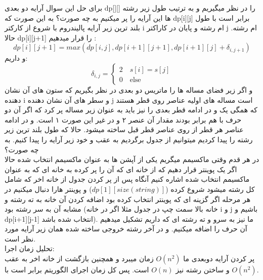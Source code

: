 \problem{}
برای حل این سوال آرایه دو بعدی dp[][] را در نظر میگیریم
و به ترتیب طول زیر رشته ها این آرایه را پر میکنیم به چه صورت؟
به این صورت که dp[i][j]
 برابر است با طول بلند ترین زیر آرایه پالیندروم 
 با شروع از کارکتر i ام رشته و پایان در کاراکتر j ام رشته.
حالا dp[i][j+1] را قرار میدهیم :\\
\[
    dp[i][j+1] = max(dp[i,j],dp[i+1][j+1],dp[i+1][j]+\delta_{i,j+1})    
\]
و داریم:\\
\[
    \delta_{i,j}=
    \begin{cases}
        2 \quad  s[i]=s[j]\\
        0 \quad  \text{else}
    \end{cases}
\]
و اگر زیر فضای مساله ها را ماتریس دو بعدی در نظر بگیریم که ستون های آن نشان دهنده i و
سطر های آن نشان دهنده j است
مساله های اولیه عناصر روی قطر هستند
که همگی یک و در ادامه قطر بعدی را نیز باید به عنوان زیر مساله پر کرد که اگر آن دو حرف با هم برابر بودند
مقدار آن عنصر ۲ و در غیر این صورت ۱ است.
و در ادامه عناصر هر قطر از روی عناصر قطر قبل ساخته میشود.
حالا که طول بلند ترین زیر رشته را پیدا کردیم میتوانیم از جدول برگردیم به عقب و خود زیر آرایه
را پیدا کنیم.
به چه صورت؟\\
در هر قدم وقتی ماکسیمم میگریم یکی از آپشن ها به عنوان ماکسیمم انتخاب شده
حالا اگر یک پوینتر قرار دهیم که از خانه ای که آن را پر کرده به خانه ای که به عنوان ماکسیمم انتخاب
شده اشاره کنیم
آنگاه پس از پر کردن جدول
از خانه اخر که شامل کل رشته میشود شروع کرده
($dp[1][size(string)]$)
و پوینتر هارا دنبال میکنیم
در هر مرحله اگر گزینه ای که پوینتر انتخاب کرده بود
اضافه کردن آن خانه به ته رشته و مشابه آن به سر رشته بود
(خانه بالا سمت چپ در جدول مثلا اگر در خانه i و j باشیم و dp[i+1][j-1] انتخاب شده باشد).
ما نیز به سرو و ته رشته ای که داریم تشکیل میدهیم
آن حرف را اضافه میکنیم.
و در آخر رشته خروجی ساخته شده همان زیر آرایه مورد نظر است.
\\
تحلیل زمان اجرا:\\
پر کردن آرایه دوبعدی ما $O(n^2)$ زمان میبرد و همچنین
بازگشت از خانه اخر به عقب و ساختن رشته نیز $O(n)$ است.
پس کل زمان اجرای الگوریتم برابر است با $O(n^2)$.
